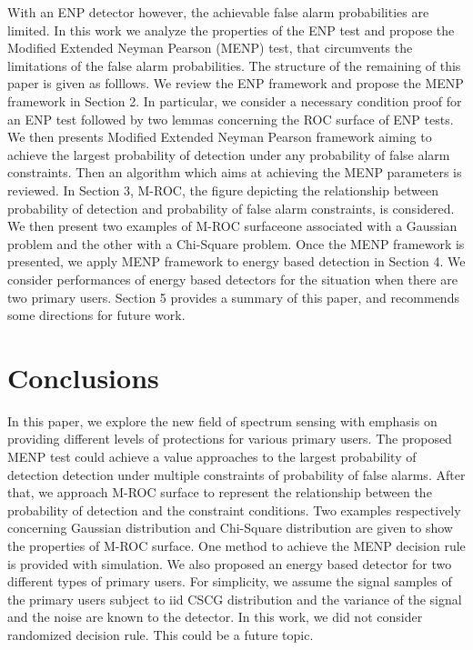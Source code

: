 \documentclass[12pt,journal,a4paper,twoside,onecolumn]{IEEEtran}
\begin{document}
\begin{spacing}{2}
With an ENP detector however, the achievable false alarm probabilities are limited. In this work we analyze the properties of the ENP test and propose the Modified Extended Neyman Pearson (MENP) test, that circumvents the limitations of the false alarm probabilities. The structure of the remaining of this paper is given as folllows.
We review the ENP framework and propose the MENP framework in Section 2. In particular,  we consider  a necessary condition proof for an  ENP test followed by  two lemmas concerning the ROC surface of ENP tests. 
We then presents Modified Extended Neyman Pearson framework aiming to  achieve the largest probability of detection  under any probability of false alarm constraints.
Then an algorithm which aims at achieving the MENP parameters is reviewed. 
In Section 3, M-ROC, the figure depicting the relationship between probability of detection and probability of false alarm constraints, is considered.  We then present two examples of M-ROC surfaceone associated with a Gaussian problem and the other with a Chi-Square problem. 
Once the MENP framework is presented, we apply MENP framework to energy based detection in Section 4. We consider  performances of energy based detectors for the situation when there are two primary users.  
Section 5 provides a summary of this paper, and recommends some directions for future work.  
\typeout{}


\typeout{}



\typeout{}


\section{Conclusions}
In this paper, we explore the new field of spectrum sensing with emphasis on providing different levels of protections for various primary users. 
The proposed MENP test could achieve a value approaches to the largest probability of detection detection under multiple constraints of probability of false alarms. 
After that, we approach M-ROC surface to represent the relationship between the probability of detection and the constraint conditions. Two examples respectively concerning Gaussian distribution and Chi-Square distribution are given to show the properties of M-ROC surface. 
One method to achieve the MENP decision rule is provided with simulation. 
We also proposed an energy based detector for two different types of primary users.
For simplicity, we assume the signal samples of the primary users subject to iid CSCG distribution and the variance of the signal and the noise are known to the detector.
In this work, we did not consider randomized decision rule. This could be a future topic.



\end{spacing}
\end{document}
